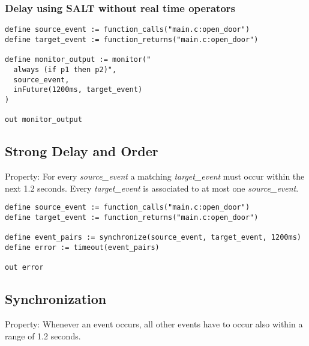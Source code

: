 %
%

\subsubsection{Delay using SALT without real time operators}

\begin{lstlisting}[language=tessla+salt]
define source_event := function_calls("main.c:open_door")
define target_event := function_returns("main.c:open_door")

define monitor_output := monitor("
  always (if p1 then p2)",
  source_event,
  inFuture(1200ms, target_event)
)

out monitor_output
\end{lstlisting}

\subsection{Strong Delay and Order}

Property: For every \emph{source\_event} a matching \emph{target\_event} must occur within the next 1.2 seconds.
Every \emph{target\_event} is associated to at most one \emph{source\_event}.

\begin{lstlisting}[language=tessla+salt]
define source_event := function_calls("main.c:open_door")
define target_event := function_returns("main.c:open_door")

define event_pairs := synchronize(source_event, target_event, 1200ms)
define error := timeout(event_pairs)

out error
\end{lstlisting}

\subsection{Synchronization}

Property: Whenever an event occurs, all other events have to occur also within a range of 1.2 seconds. 

